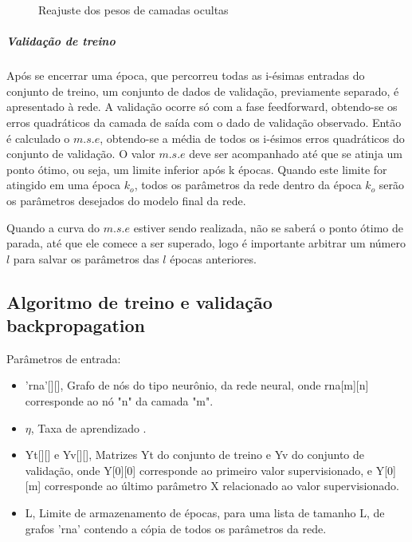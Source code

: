 \documentclass[	12pt, Times, openright, twoside, a4paper, english, brazil]{abntex2}
\begin{document}
            \begin{figure}[!ht]
          	\caption{Reajuste dos pesos de camadas ocultas}
            \end{figure}
           
            \subparagraph{Validação de treino}
            Após se encerrar uma época, que percorreu todas as i-ésimas entradas do conjunto de treino, um conjunto de dados de validação, previamente separado, é apresentado à rede.
            A validação ocorre só com a fase feedforward, obtendo-se os erros quadráticos da camada de saída com o dado de validação observado.
            Então é calculado o $m.s.e$, obtendo-se a média de todos os i-ésimos erros quadráticos do conjunto de validação.
            O valor $m.s.e$ deve ser acompanhado até que se atinja um ponto ótimo, ou seja, um limite inferior após k épocas.
            Quando este limite for atingido em uma época $k_o$, todos os parâmetros da rede dentro da época $k_o$ serão os parâmetros desejados do modelo final da rede.
            
            Quando a curva do $m.s.e$ estiver sendo realizada, não se saberá o ponto ótimo de parada, até que ele comece a ser superado, logo é importante arbitrar um número $l$ para salvar os parâmetros das $l$ épocas anteriores.
        
        \subsection{Algoritmo de treino e validação backpropagation}
            Parâmetros de entrada:
            \begin{itemize}
                \item 'rna'[][], Grafo de nós do tipo neurônio, da rede neural, onde rna[m][n] corresponde ao nó "n" da camada "m".
                \item $\eta$, Taxa de aprendizado .
                \item Yt[][] e Yv[][], Matrizes Yt do conjunto de treino e Yv do conjunto de validação, onde Y[0][0] corresponde ao primeiro valor supervisionado, e Y[0][m] corresponde ao último parâmetro X relacionado ao valor supervisionado.
                \item L, Limite de armazenamento de épocas, para uma lista de tamanho L, de grafos 'rna' contendo a cópia de todos os parâmetros da rede.                
            \end{itemize}
\end{document}
